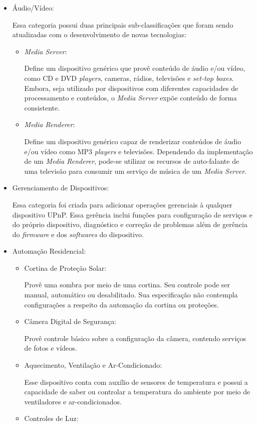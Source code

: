 \begin{itemize}
\item Áudio/Vídeo:

	Essa categoria possui duas principais sub-classificações que foram sendo atualizadas com o desenvolvimento de novas tecnologias: 
	\begin{itemize}
		\item \emph{Media Server}:

			Define um dispositivo genérico que provê conteúdo de áudio e/ou vídeo, como CD e DVD \emph{players}, cameras, rádios, televisões e \emph{set-top boxes}. Embora, seja utilizado por dispositivos com diferentes capacidades de processamento e conteúdos, o \emph{Media Server} expõe conteúdo de forma consistente.

		\item \emph{Media Renderer}:

			Define um dispositivo genérico capaz de renderizar conteúdos de áudio e/ou vídeo como MP3 \emph{players} e televisões. Dependendo da implementação de um \emph{Media Renderer}, pode-se utilizar os recursos de auto-falante de uma televisão para consumir um serviço de música de um \emph{Media Server}.
	\end{itemize}
\item Gerenciamento de Dispositivos:

	Essa categoria foi criada para adicionar operações gerenciais à qualquer dispositivo UPnP. Essa gerência inclui funções para configuração de serviços e do próprio dispositivo, diagnóstico e correção de problemas além de gerência do \emph{firmware} e dos \emph{softwares} do dispositivo.

\item Automação Residencial:
	\begin{itemize}
		\item Cortina de Proteção Solar:

			Provê uma sombra por meio de uma cortina. Seu controle pode ser manual, automático ou desabilitado. Sua especificação não contempla configurações a respeito da automação da cortina ou proteções.
		\item Câmera Digital de Segurança:

			Provê controle básico sobre a configuração da câmera, contendo serviços de fotos e vídeos.
		\item Aquecimento, Ventilação e Ar-Condicionado:
			
			Esse dispositivo conta com auxílio de sensores de temperatura e possui a capacidade de saber ou controlar a temperatura do ambiente por meio de ventiladores e ar-condicionados.
		\item Controles de Luz:
			

\end{itemize}
\end{itemize}
